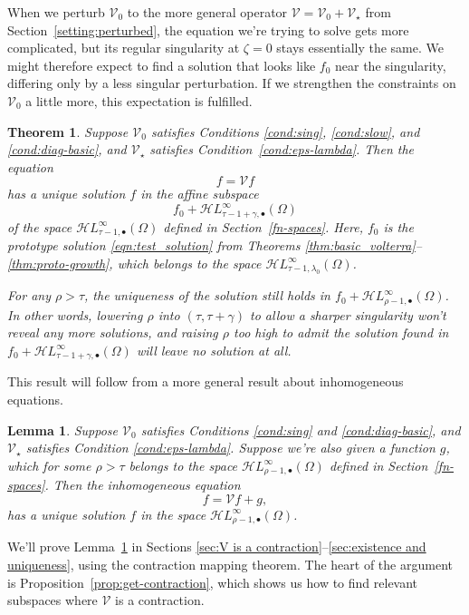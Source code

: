 \documentclass{article}
\theoremstyle{plain}
\newtheorem{lemma}{Lemma}
\newtheorem{thm}{Theorem}
\newcommand{\singexp}[2]{\mathcal{H}L^\infty_{#1, #2}}
\newcommand{\singexpalg}[1]{\singexp{#1}{\bullet}}
\newcommand{\volterra}{\mathcal{V}}
\newcommand{\hardpart}{\mathcal{V}_0}
\newcommand{\softpart}{\mathcal{V}_\star}
\newcommand{\solproto}{f_0}
\begin{document}
When we perturb $\hardpart$ to the more general operator $\volterra = \hardpart + \softpart$ from Section~\ref{setting:perturbed}, the equation we're trying to solve gets more complicated, but its regular singularity at $\zeta = 0$ stays essentially the same. We might therefore expect to find a solution that looks like $\solproto$ near the singularity, differing only by a less singular perturbation. If we strengthen the constraints on $\hardpart$ a little more, this expectation is fulfilled.
\begin{thm}\label{thm:general_volterra}
Suppose $\hardpart$ satisfies {\em Conditions \eqref{cond:sing}}, \eqref{cond:slow}, and \eqref{cond:diag-basic}, and $\softpart$ satisfies {\em Condition~\eqref{cond:eps-lambda}}. Then the equation
\[f = \volterra f\]
has a unique solution $f$ in the affine subspace
\[ f_0 + \singexpalg{\tau-1+\gamma}(\Omega) \]
of the space $\singexpalg{\tau-1}(\Omega)$ defined in Section~\ref{fn-spaces}. Here, $f_0$ is the prototype solution \eqref{eqn:test_solution} from Theorems \ref{thm:basic_volterra}--\ref{thm:proto-growth}, which belongs to the space $\singexp{\tau-1}{\lambda_0}(\Omega)$.

For any $\rho > \tau$, the uniqueness of the solution still holds in $f_0 + \singexpalg{\rho-1}(\Omega)$. In other words, lowering $\rho$ into $(\tau, \tau+\gamma)$ to allow a sharper singularity won't reveal any more solutions, and raising $\rho$ too high to admit the solution found in $f_0 + \singexpalg{\tau-1+\gamma}(\Omega)$ will leave no solution at all.
\end{thm}
This result will follow from a more general result about inhomogeneous equations.
\begin{lemma}\label{lem:perturbed_volterra}
Suppose $\hardpart$ satisfies {\em Conditions \eqref{cond:sing}} and \eqref{cond:diag-basic}, and $\softpart$ satisfies {\em Condition \eqref{cond:eps-lambda}}. Suppose we're also given a function $g$, which for some $\rho > \tau$ belongs to the space $\singexpalg{\rho-1}(\Omega)$ defined in Section~\ref{fn-spaces}. Then the inhomogeneous equation
\[ f = \volterra f + g, \]
has a unique solution $f$ in the space $\singexpalg{\rho-1}(\Omega)$.
\end{lemma}
We'll prove Lemma~\ref{lem:perturbed_volterra} in Sections \ref{sec:V is a contraction}--\ref{sec:existence and uniqueness}, using the contraction mapping theorem. The heart of the argument is Proposition~\ref{prop:get-contraction}, which shows us how to find relevant subspaces where $\volterra$ is a contraction.
\end{document}
